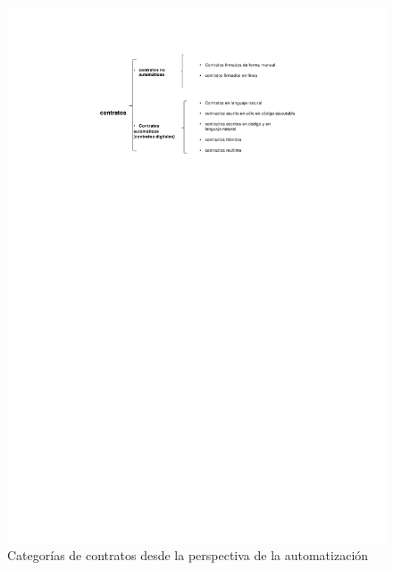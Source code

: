 \documentclass[12pt]{report} %
\begin{document}
\begin{itemize}
\begin{figure}
\centering
\includegraphics[width=0.85\columnwidth]{imagenes/llavescontratos.pdf}
\caption{Categorías de contratos desde la perspectiva de la automatización}
\label{llavescontratos}
\end{figure} 


\end{itemize}
\end{document}
